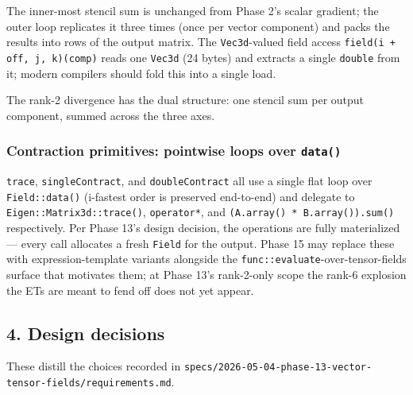 The inner-most stencil sum is unchanged from Phase 2's scalar
gradient; the outer loop replicates it three times (once per vector
component) and packs the results into rows of the output matrix. The
\passthrough{\lstinline!Vec3d!}-valued field access
\passthrough{\lstinline!field(i + off, j, k)(comp)!} reads one
\passthrough{\lstinline!Vec3d!} (24 bytes) and extracts a single
\passthrough{\lstinline!double!} from it; modern compilers should
fold this into a single load.

The rank-2 divergence has the dual structure: one stencil sum per
output component, summed across the three axes.

\subsubsection{Contraction primitives: pointwise loops over
\passthrough{\lstinline!data()!}}\label{phase13-contraction}

\passthrough{\lstinline!trace!},
\passthrough{\lstinline!singleContract!}, and
\passthrough{\lstinline!doubleContract!} all use a single flat loop
over \passthrough{\lstinline!Field::data()!} (i-fastest order is
preserved end-to-end) and delegate to
\passthrough{\lstinline!Eigen::Matrix3d::trace()!},
\passthrough{\lstinline!operator*!}, and
\passthrough{\lstinline!(A.array() * B.array()).sum()!}
respectively. Per Phase 13's design decision, the operations are
fully materialized — every call allocates a fresh
\passthrough{\lstinline!Field!} for the output. Phase 15 may replace
these with expression-template variants alongside the
\passthrough{\lstinline!func::evaluate!}-over-tensor-fields surface
that motivates them; at Phase 13's rank-2-only scope the rank-6
explosion the ETs are meant to fend off does not yet appear.

\subsection{4. Design decisions}\label{phase13-decisions}

These distill the choices recorded in
\passthrough{\lstinline!specs/2026-05-04-phase-13-vector-tensor-fields/requirements.md!}.

